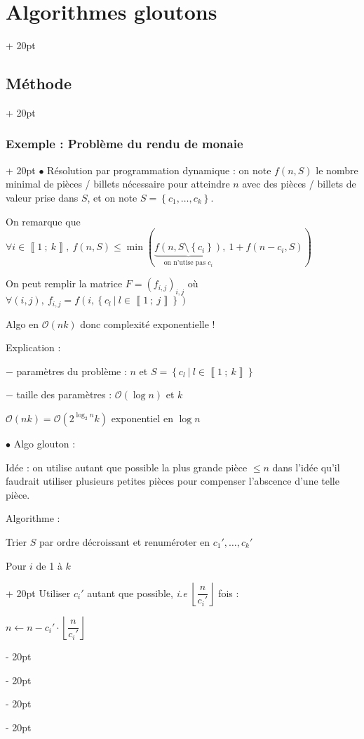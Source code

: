 \documentclass[a4paper, 12pt, twoside]{article}
\newcommand{\nset}[2]{\left\llbracket #1\ ;\ #2 \right\rrbracket}
\newcommand{\set}[1]{\left\{ #1 \right\}}
\newcommand{\floor}[1]{\left\lfloor #1 \right\rfloor}
\renewcommand{\le}{\leqslant}
\newcommand{\ind}[1][20pt]{\advance\leftskip + #1}
\newcommand{\deind}[1][20pt]{\advance\leftskip - #1}
\newenvironment{indt}[2][20pt]{#2 \par \ind[#1]}{\par \deind} %
\begin{document}
\begin{indt}{\section{Algorithmes gloutons}}
\begin{indt}{\subsection{Méthode}}
\begin{indt}{\subsubsection{Exemple : Problème du rendu de monaie}}
                $\bullet$ Résolution par programmation dynamique : on note $f(n, S)$ le nombre minimal de pièces / billets nécessaire pour atteindre $n$ avec des pièces / billets de valeur prise dans $S$, et on note $S = \set{c_1, \ldots, c_k}$.
                
                On remarque que $\forall i \in \nset 1 k,\ f(n, S) \le \min( \underbrace{f(n, S \setminus \set{c_i})}_{\text{on n'utise pas $c_i$}},\ 1 + f(n - c_i, S) )$
                
                On peut remplir la matrice $F = (f_{i, j})_{i, j}$ où $\forall (i, j),\ f_{i, j} = f(i, \set{c_l\ |\ l \in \nset 1 j})$
                
                Algo en $\mathcal O(nk)$ donc complexité exponentielle !
                
                Explication :
                
                $-$ paramètres du problème : $n$ et $S = \set{c_l\ |\ l \in \nset 1 k}$
                
                $-$ taille des paramètres : $\mathcal O(\log n)$ et $k$
                
                $\mathcal O(nk) = \mathcal O(2^{\log_2 n} k)$ exponentiel en $\log n$
                
                \vspace{12pt}
                
                $\bullet$ Algo glouton :
                
                Idée : on utilise autant que possible la plus grande pièce $\le n$ dans l'idée qu'il faudrait utiliser plusieurs petites pièces pour compenser l'abscence d'une telle pièce.
                
                \vspace{6pt}
                
                Algorithme :
                \begin{pseudocode}
                    Trier $S$ par ordre décroissant et renuméroter en $c_1', \ldots, c_k'$
                    
                    \begin{indt}{Pour $i$ de 1 à $k$}
                        Utiliser $c_i'$ autant que possible, \textit{i.e} $\floor{\dfrac{n}{c_i'}}$ fois :
                        
                        $n \leftarrow n - c_i' \cdot \floor{\dfrac n {c_i'}}$
                    \end{indt}
                    

\end{pseudocode}
\end{indt}
\end{indt}
\end{indt}
\end{document}
